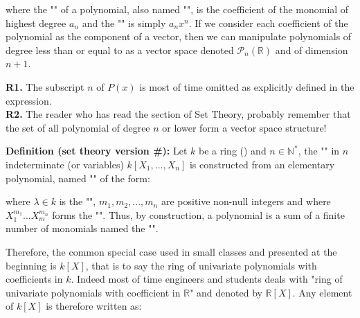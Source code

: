 	 where the "" of a polynomial, also named "", is the coefficient of the monomial of highest degree $a_n$ and the "" is simply $a_nx^n$.
	If we consider each coefficient of the polynomial as the component of a vector\label{polynomial vector}, then we can manipulate polynomials of degree less than or equal to as a vector space denoted $\mathcal{P}_n(\mathbb{R})$ and of dimension $n+1$.
	\begin{tcolorbox}[title=Remarks,colframe=black,arc=10pt]
	\textbf{R1.} The subscript $n$ of $P (x)$ is most of time omitted as explicitly defined in the expression.\\
	
	\textbf{R2.} The reader who has read the section of Set Theory, probably remember that the set of all polynomial of degree $n$ or lower form a vector space structure!
	\end{tcolorbox}
	\textbf{Definition (set theory version \#\mydef):} Let $k$ be a ring () and $n\in \mathbb{N}^{*}$, the "\label{polynomial ring}" in $n$ indeterminate (or variables) $k[X_1,...,X_n]$ is constructed from an elementary polynomial, named "" of the form:
	
	where $\lambda \in k$ is the "", $m_1,m_2,...,m_n$ are positive non-null integers and where $X_1^{m_1}...X_m^{m_n}$ forms the "". Thus, by construction, a polynomial is a sum of a finite number of monomials named the "".
	
	Therefore, the common special case used in small classes and presented at the beginning is $k[X]$, that is to say the ring of univariate polynomials with coefficients in $k$. Indeed most of time engineers and students deals with "ring of univariate polynomials with coefficient in $\mathbb{R}$" and denoted by $\mathbb{R}[X]$. Any element of $k[X]$ is therefore written as:
	
